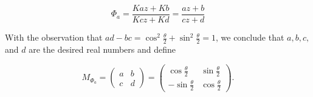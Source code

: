 \begin{solution}
  $$
  \Phi_a = \frac{Ka z + Kb}{Kc z + Kd} = \frac{az + b}{cz + d}
  $$

  With the observation that $ad - bc = \cos^2{\frac{\theta}{2}} + \sin^2{\frac{\theta}{2}} = 1$, we conclude that
  $a, b, c,$ and $d$ are the desired real numbers and define

  $$
  M_{\Phi_a} = \begin{pmatrix}
    a & b \\
    c & d
  \end{pmatrix} = \begin{pmatrix}
    \cos{\frac{\theta}{2}} & \sin{\frac{\theta}{2}} \\
    -\sin{\frac{\theta}{2}} & \cos{\frac{\theta}{2}}
  \end{pmatrix}.
  $$
  \ \\
\end{solution}